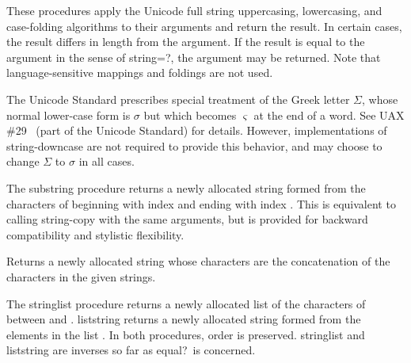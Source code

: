 \begin{entry}{
}


These procedures apply the Unicode full string uppercasing, lowercasing,
and case-folding algorithms to their arguments and return the result.
In certain cases, the result differs in length from the argument.
If the result is equal to the argument in the sense of {\cf string=?}, the argument may be returned.
Note that language-sensitive mappings and foldings are not used.

The Unicode Standard prescribes special treatment of the Greek letter
$\Sigma$, whose normal lower-case form is $\sigma$ but which becomes
$\varsigma$ at the end of a word.  See UAX \#29~\cite{uax29} (part of
the Unicode Standard) for details.  However, implementations of {\cf
string-downcase} are not required to provide this behavior, and may
choose to change $\Sigma$ to $\sigma$ in all cases.

\end{entry}


\begin{entry}{
}

The {\cf substring} procedure returns a newly allocated string formed from the characters of
 beginning with index  and ending with index
.
This is equivalent to calling {\cf string-copy} with the same arguments,
but is provided for backward compatibility and
stylistic flexibility.
\end{entry}


\begin{entry}{
}

Returns a newly allocated string whose characters are the concatenation of the
characters in the given strings.

\end{entry}


\begin{entry}{
}

The {\cf string\coerce{}list} procedure returns a newly allocated list of the
characters of  between  and .
{\cf list\coerce{}string}
returns a newly allocated string formed from the elements in the list
.
In both procedures, order is preserved.
{\cf string\coerce{}list}
and {\cf list\coerce{}string} are
inverses so far as {\cf equal?}\ is concerned.

\end{entry}


